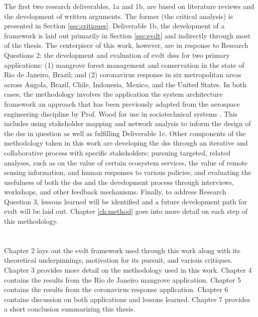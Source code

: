 The first two research deliverables, 1a and 1b, are based on literature reviews and the development of written arguments. The former (the critical analysis) is presented in Section \ref{sec:critiques}. Deliverable 1b, the development of a framework is laid out primarily in Section \ref{sec:evdt} and indirectly through most of the thesis. The centerpiece of this work, however, are in response to Research Questions 2: the development and evaluation of \ac{evdt} \acp{dss} for two primary applications: (1) mangrove forest management and conservation in the state of Rio de Janeiro, Brazil; and (2) coronavirus response in six metropolitan areas across Angola, Brazil, Chile, Indonesia, Mexico, and the United States. In both cases, the methodology involves the application the system architecture framework \cite{maierArtSystemsArchitecting2009, crawleySystemArchitectureStrategy2015} an approach that has been previously adapted from the aerospace engineering discipline by Prof. Wood for use in sociotechnical systems \cite{pfotenhauerArchitectingComplexInternational2016}. This includes using stakeholder mapping and network analysis to inform the design of the \ac{dss} in question as well as fulfilling Deliverable 1c. Other components of the methodology taken in this work are developing the \ac{dss} through an iterative and collaborative process with specific stakeholders; pursuing targeted, related analyses, such as on the value of certain ecosystem services, the value of remote sensing information, and human responses to various policies; and evaluating the usefulness of both the \ac{dss} and the development process through interviews, workshops, and other feedback mechanisms. Finally, to address Research Question 3, lessons learned will be identified and a future development path for \ac{evdt} will be laid out. Chapter \ref{ch:method} goes into more detail on each step of this methodology.

\section{}

Chapter 2 lays out the \ac{evdt} framework used through this work along with its theoretical underpinnings, motivation for its pursuit, and various critiques. Chapter 3 provides more detail on the methodology used in this work. Chapter 4 contains the results from the Rio de Janeiro mangrove application. Chapter 5 contains the results from the coronavirus response application. Chapter 6 contains discussion on both applications and lessons learned. Chapter 7 provides a short conclusion summarizing this thesis.